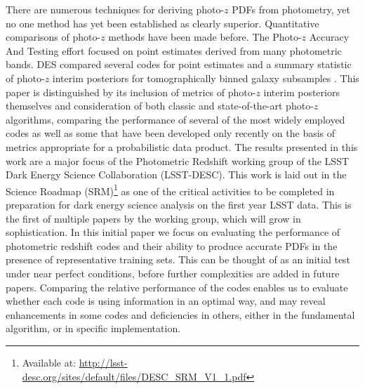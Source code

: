 There are numerous techniques for deriving photo-$z$ PDFs from photometry, yet no one method has yet been established as clearly superior.
Quantitative comparisons of photo-$z$ methods have been made before.
The Photo-$z$ Accuracy And Testing \citep[PHAT,][]{Hildebrandt:10} effort focused on point estimates derived from many photometric bands.
DES compared several codes for point estimates \citep{Sanchez:14} and a summary statistic of photo-$z$ interim posteriors for tomographically binned galaxy subsamples \citep{Bonnett:16}.
This paper is distinguished by its inclusion of metrics of photo-$z$ interim posteriors themselves and consideration of both classic and state-of-the-art photo-$z$ algorithms, comparing the performance of several of the most widely employed codes as well as some that have been developed only recently on the basis of metrics appropriate for a probabilistic data product.
The results presented in this work are
a major focus of the Photometric Redshift working group of the LSST Dark Energy Science Collaboration (LSST-DESC).
This work is laid out in the Science Roadmap (SRM)\footnote{Available at: \url{http://lsst-desc.org/sites/default/files/DESC_SRM_V1_1.pdf}} as one of the critical activities to be completed in preparation for dark energy science analysis on the first year LSST data.
This is the first of multiple papers by the working group, which will grow in sophistication.
In this initial paper we focus on evaluating the performance of photometric redshift codes and their ability to produce accurate PDFs in the presence of representative training sets.
This can be thought of as an initial test under near perfect conditions, before further complexities are added in future papers.
Comparing the relative performance of the codes enables us to evaluate whether each code is using information in an optimal way, and may reveal enhancements in some codes and deficiencies in others, either in the fundamental algorithm, or in specific implementation.

